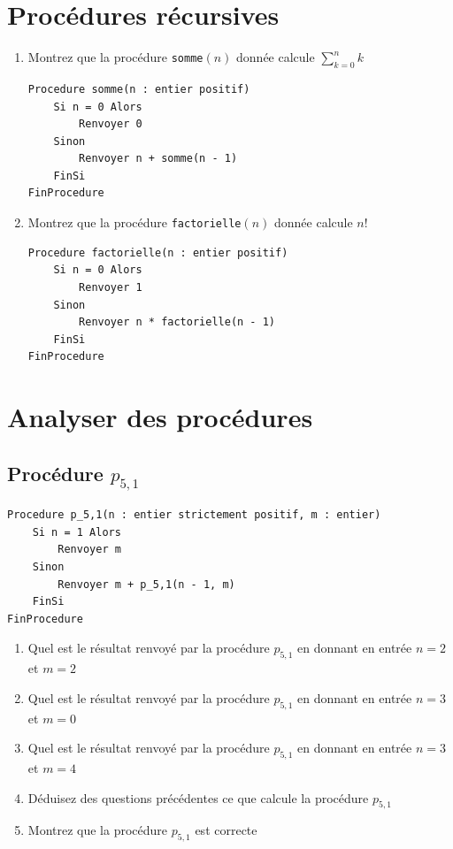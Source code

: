 \documentclass[a4paper,11pt]{article}
\begin{document}
\section{Procédures récursives}

\begin{enumerate}
\item Montrez que la procédure \texttt{somme}$(n)$ donnée calcule $\sum_{k=0}^{n} k$

\begin{lstlisting}
Procedure somme(n : entier positif)
    Si n = 0 Alors
        Renvoyer 0
    Sinon
        Renvoyer n + somme(n - 1)
    FinSi
FinProcedure
\end{lstlisting}

\item Montrez que la procédure \texttt{factorielle}$(n)$ donnée calcule $n!$

\begin{lstlisting}
Procedure factorielle(n : entier positif)
    Si n = 0 Alors
        Renvoyer 1
    Sinon
        Renvoyer n * factorielle(n - 1)
    FinSi
FinProcedure
\end{lstlisting}
\end{enumerate}

\section{Analyser des procédures}

\subsection{Procédure $p_{5,1}$}

\begin{lstlisting}
Procedure p_5,1(n : entier strictement positif, m : entier)
    Si n = 1 Alors
        Renvoyer m
    Sinon
        Renvoyer m + p_5,1(n - 1, m)
    FinSi
FinProcedure
\end{lstlisting}

\begin{enumerate}
\item Quel est le résultat renvoyé par la procédure $p_{5,1}$ en donnant en entrée $n = 2$ et $m = 2$

\item Quel est le résultat renvoyé par la procédure $p_{5,1}$ en donnant en entrée $n = 3$ et $m = 0$

\item Quel est le résultat renvoyé par la procédure $p_{5,1}$ en donnant en entrée $n = 3$ et $m = 4$

\item Déduisez des questions précédentes ce que calcule la procédure $p_{5,1}$

\item Montrez que la procédure $p_{5,1}$ est correcte
\end{enumerate}
\end{document}
